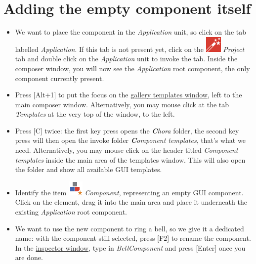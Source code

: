 \documentclass[
  a4paper,
,tablecaptionabove
]{scrbook}
\begin{document}
\hypertarget{_adding_the_empty_component_itself}{%
\section{Adding the empty component
itself}\label{_adding_the_empty_component_itself}}

\begin{itemize}
\item
  We want to place the component in the \emph{Application} unit, so
  click on the tab labelled \emph{Application}. If this tab is not
  present yet, click on the
  \includegraphics{./../asciidoc/modules/ROOT/assets/images/icons/EmbeddedWizardIcon.png}
  \emph{Project} tab and double click on the \emph{Application} unit to
  invoke the tab. Inside the composer window, you will now see the
  \emph{Application} root component, the only component currently
  present.
\item
  Press {[}Alt+1{]} to put the focus on the
  \href{https://doc.embedded-wizard.de/gallery-templates-window}{gallery
  templates window}, left to the main composer window. Alternatively,
  you may mouse click at the tab \emph{Templates} at the very top of the
  window, to the left.
\item
  Press {[}C{]} twice: the first key press opens the
  \emph{\textbf{C}hora} folder, the second key press will then open the
  invoke folder \emph{\textbf{C}omponent templates}, that's what we
  need. Alternatively, you may mouse click on the header titled
  \emph{Component templates} inside the main area of the templates
  window. This will also open the folder and show all available GUI
  templates.
\item
  Identify the item \includegraphics{./../asciidoc/modules/ROOT/assets/images/icons/ComponentIcon.png}
  \emph{Component}, representing an empty GUI component. Click on the
  element, drag it into the main area and place it underneath the
  existing \emph{Application} root component.
\item
  We want to use the new component to ring a bell, so we give it a
  dedicated name: with the component still selected, press {[}F2{]}
  to rename the component. In the
  \href{https://doc.embedded-wizard.de/inspector-window}{inspector
  window}, type in \emph{BellComponent} and press {[}Enter{]} once
  you are done.
\end{itemize}
\end{document}
